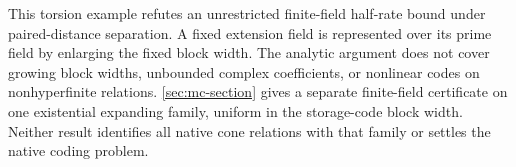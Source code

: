 This torsion example refutes an unrestricted finite-field half-rate bound
under paired-distance separation. A fixed extension field is represented
over its prime field by enlarging the fixed block width. The analytic argument does not cover
growing block widths, unbounded complex coefficients, or nonlinear codes
on nonhyperfinite relations.  \cref{sec:mc-section} gives a separate
finite-field certificate on one existential expanding family, uniform
in the storage-code block width.  Neither result identifies all native
cone relations with that family or settles the native coding problem.
